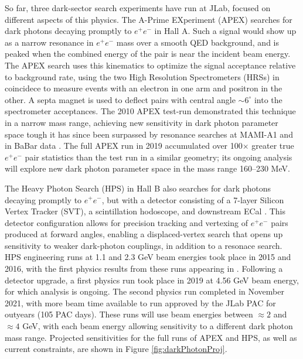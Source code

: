 
So far, three dark-sector search experiments have run at JLab, focused on different aspects of this physics. 
%
The A-Prime EXperiment (APEX) \cite{Essig:2010xa} searches for dark photons decaying promptly to $e^+e^-$ in Hall A.  Such a signal would show up as a narrow resonance in $e^+e^-$ mass over a smooth QED background, and is peaked when the combined energy of the pair is near the incident beam energy.  The APEX search uses this kinematics to optimize the signal acceptance relative to background rate, using the two High Resolution Spectrometers (HRSs) in coincidece to measure events with an electron in one arm and positron in the other.  A septa magnet is used to deflect pairs with central angle $\sim 6^\circ$ into the spectrometer acceptances.   The 2010 APEX test-run \cite{Abrahamyan:2011gv} demonstrated this technique in a narrow mass range, achieving new sensitivity in dark photon parameter space tough it has since been surpassed by resonance searches at MAMI-A1 \cite{Merkel:2014avp} and in BaBar data  \cite{Lees:2014xha}.  The full APEX run in 2019 accumulated over 100$\times$ greater true $e^+e^-$ pair statistics than the test run in a similar geometry; its ongoing analysis will explore new dark photon parameter space in the mass range 160--230 MeV.   

 The Heavy Photon Search (HPS) in Hall B also searches for  dark photons decaying promptly to $e^+e^-$, but with a detector consisting of a 7-layer Silicon Vertex Tracker (SVT), a scintillation hodoscope, and downstream ECal \cite{Battaglieri:2014hga,Balossino:2016nly}. This detector configuration allows for precision tracking and vertexing of $e^+e^-$ pairs produced at forward angles, enabling a displaced-vertex search that opens up sensitivity to weaker dark-photon couplings, in addition to a resonace search.  HPS engineering runs at 1.1 and 2.3 GeV beam energies took place in 2015 and 2016, with the first physics results from these runs appearing in \cite{Adrian:2018scb,Solt:2020zbi}.  Following a detector upgrade, a first physics run took place in 2019 at 4.56 GeV beam energy, for which analysis is ongoing. The second physics run completed in November 2021, with more beam time available to run approved by the JLab PAC for outyears (105 PAC days).  These runs will use beam energies between $\approx 2$ and $\approx 4$ GeV, with each beam energy allowing sensitivity to a different dark photon mass range.  Projected sensitivities for the full runs of APEX and HPS, as well as current constraints, are shown in Figure \ref{fig:darkPhotonProj}. 


